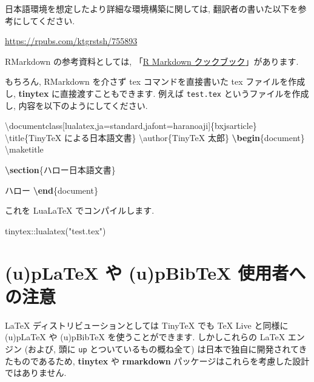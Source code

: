 \documentclass[
  xelatex,ja=standard,jafont=noto]{bxjsreport}
\newenvironment{Shaded}{\begin{snugshade}}{\end{snugshade}}
\newcommand{\BuiltInTok}[1]{#1}
\newcommand{\ExtensionTok}[1]{#1}
\newcommand{\FunctionTok}[1]{\textcolor[rgb]{0.00,0.00,0.00}{#1}}
\newcommand{\KeywordTok}[1]{\textcolor[rgb]{0.13,0.29,0.53}{\textbf{#1}}}
\newcommand{\NormalTok}[1]{#1}
\newcommand{\SpecialCharTok}[1]{\textcolor[rgb]{0.00,0.00,0.00}{#1}}
\newcommand{\StringTok}[1]{\textcolor[rgb]{0.31,0.60,0.02}{#1}}
\begin{document}
日本語環境を想定したより詳細な環境構築に関しては,
翻訳者の書いた以下を参考にしてください.

\url{https://rpubs.com/ktgrstsh/755893}

RMarkdown の参考資料としては,
「\href{https://gedevan-aleksizde.github.io/rmarkdown-cookbook/}{R
Markdown クックブック}」があります.

もちろん, RMarkdown を介さず tex コマンドを直接書いた tex
ファイルを作成し, \textbf{tinytex} に直接渡すこともできます. 例えば
\texttt{test.tex} というファイルを作成し,
内容を以下のようにしてください.

\begin{Shaded}
\begin{Highlighting}[]
\BuiltInTok{\textbackslash{}documentclass}\NormalTok{[lualatex,ja=standard,jafont=haranoaji]\{}\ExtensionTok{bxjsarticle}\NormalTok{\}}
\FunctionTok{\textbackslash{}title}\NormalTok{\{TinyTeX による日本語文書\}}
\FunctionTok{\textbackslash{}author}\NormalTok{\{TinyTeX 太郎\}}
\KeywordTok{\textbackslash{}begin}\NormalTok{\{}\ExtensionTok{document}\NormalTok{\}}
\FunctionTok{\textbackslash{}maketitle}

\KeywordTok{\textbackslash{}section}\NormalTok{\{ハロー日本語文書\}}

\NormalTok{ハロー}
\KeywordTok{\textbackslash{}end}\NormalTok{\{}\ExtensionTok{document}\NormalTok{\}}
\end{Highlighting}
\end{Shaded}

これを LuaLaTeX でコンパイルします.

\begin{Shaded}
\begin{Highlighting}[numbers=left,,]
\NormalTok{tinytex}\SpecialCharTok{::}\FunctionTok{lualatex}\NormalTok{(}\StringTok{"test.tex"}\NormalTok{)}
\end{Highlighting}
\end{Shaded}

\hypertarget{uplatex-ux3084-upbibtex-ux4f7fux7528ux8005ux3078ux306eux6ce8ux610f}{%
\section{(u)pLaTeX や (u)pBibTeX
使用者への注意}\label{uplatex-ux3084-upbibtex-ux4f7fux7528ux8005ux3078ux306eux6ce8ux610f}}

LaTeX ディストリビューションとしては TinyTeX でも TeX Live と同様に
(u)pLaTeX や (u)pBibTeX を使うことができます. しかしこれらの LaTeX
エンジン (および, 頭に \texttt{up} とついているもの概ね全て)
は日本で独自に開発されてきたものであるため, \textbf{tinytex} や
\textbf{rmarkdown} パッケージはこれらを考慮した設計ではありません.
\end{document}
